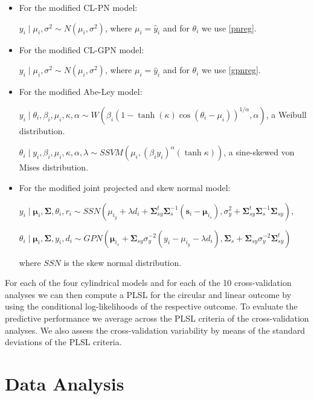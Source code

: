 \documentclass[12pt,]{article}
\begin{document}
\begin{itemize}
\item For the modified CL-PN model:

$y_i \mid \mu_i, \sigma^2 \sim N(\mu_i, \sigma^2)$, where $\mu_i = \hat{y}_i$ and for $\theta_i$ we use \eqref{pnreg}.

\item For the modified CL-GPN model:

$y_i \mid \mu_i, \sigma^2 \sim N(\mu_i, \sigma^2)$, where $\mu_i = \hat{y}_i$ and for $\theta_i$ we use \eqref{gpnreg}.

\item For the modified Abe-Ley model:

$y_i \mid \theta_i, \beta_i, \mu_i, \kappa, \alpha \sim W\left(\beta_i(1-\tanh(\kappa)\cos(\theta_i - \mu_i))^{1/\alpha}, \alpha\right)$, a Weibull distribution.

$\theta_i \mid y_i, \beta_i, \mu_i, \kappa, \alpha, \lambda \sim SSVM\left(\mu_i, (\beta_iy_i)^{\alpha}(\tanh{\kappa})\right)$, a sine-skewed von Mises distribution.

\item For the modified joint projected and skew normal model:

$y_i \mid \boldsymbol{\mu}_i, \boldsymbol{\Sigma}, \theta_i, r_i \sim SSN(\mu_{i_y} + \lambda d_i + \boldsymbol{\Sigma}_{sy}^t\boldsymbol{\Sigma}_s^{-1}(\boldsymbol{s}_i - \boldsymbol{\mu}_{i_s}), \sigma^2_y + \boldsymbol{\Sigma}_{sy}^t\boldsymbol{\Sigma}_s^{-1}\boldsymbol{\Sigma}_{sy}),$

$\theta_i \mid \boldsymbol{\mu}_i, \boldsymbol{\Sigma}, y_i, d_i \sim GPN(\boldsymbol{\mu}_{i_s} + \boldsymbol{\Sigma}_{sy}\sigma^{-2}_y(y_i - \mu_{i_y} - \lambda d_i), \boldsymbol{\Sigma}_s + \boldsymbol{\Sigma}_{sy}\sigma_y^{-2}\boldsymbol{\Sigma}_{sy}^t)$

where $SSN$ is the skew normal distribution.
\end{itemize}

\noindent For each of the four cylindrical models and for each of the 10
cross-validation analyses we can then compute a PLSL for the circular
and linear outcome by using the conditional log-likelihoods of the
respective outcome. To evaluate the predictive performance we average
across the PLSL criteria of the cross-validation analyses. We also
assess the cross-validation variability by means of the standard
deviations of the PLSL criteria.

\section{Data Analysis}\label{DataAnalysis}
\end{document}
